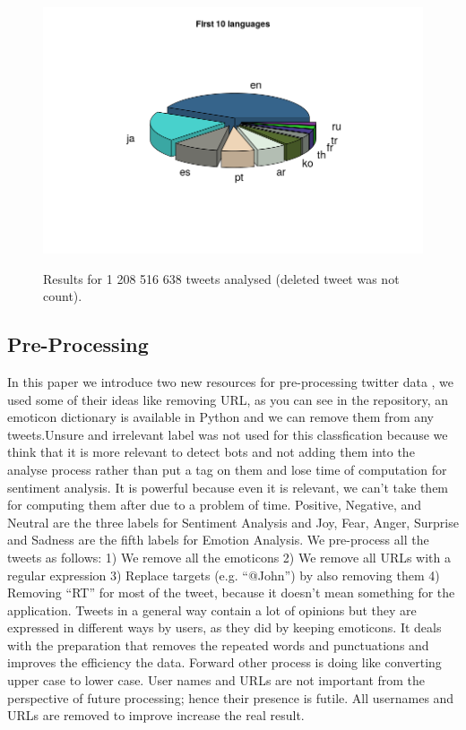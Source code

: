 \documentclass{acmtog} %
\begin{document}
\begin{figure}[H]
{\includegraphics[width=\linewidth]{first_ten_languages.png}}
\caption{Results for 1 208 516 638 tweets analysed (deleted tweet was not count).}
  \label{fig:trump_results}
\end{figure}


\subsection{Pre-Processing}
\label{subsub:preprocessing}

In this paper we introduce two new resources for pre-processing twitter data \cite{Jianqiang17}, we used some of their ideas like removing URL, as you can see in the repository, an emoticon dictionary is available in Python and we can remove them from any tweets.Unsure and irrelevant label was not used for this classfication \cite{Poddar16} because we think that it is more relevant to detect bots and not adding them into the analyse process rather than put a tag on them and lose time of computation for sentiment analysis. It is powerful because even it is relevant, we can’t take them for computing them after due to a problem of time. Positive, Negative, and Neutral are the three labels for Sentiment Analysis and Joy, Fear, Anger, Surprise and Sadness are the fifth labels for Emotion Analysis. We pre-process all the tweets as follows:
1) We remove all the emoticons
2) We remove all URLs with a regular expression 
3) Replace targets (e.g. “@John”) by also removing them
4) Removing “RT” for most of the tweet, because it doesn’t mean something for the application. 
Tweets in a general way contain a lot of opinions but they are expressed in different ways by users, as they did \cite{Rebecca11} by keeping emoticons. It deals with the preparation that removes the repeated words and punctuations and improves the efficiency the data. Forward other process is doing like converting upper case to lower case. User names and URLs are not important from the perspective of future processing; hence their presence is futile. All usernames and URLs are removed to improve increase the real result. 
\end{document}
